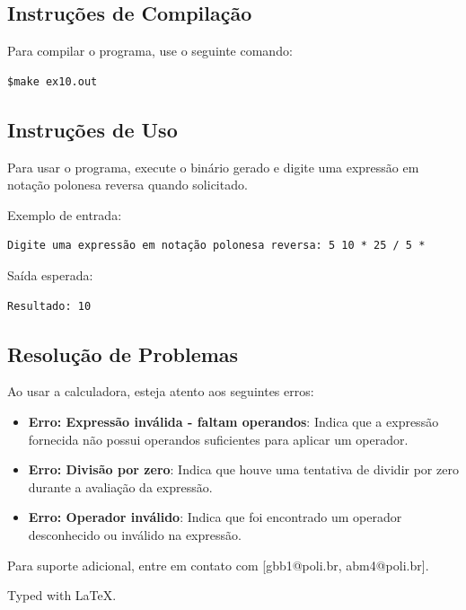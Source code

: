 \documentclass[a4paper,12pt]{article}
\begin{document}
\subsection{Instruções de Compilação}
Para compilar o programa, use o seguinte comando:
\begin{verbatim}
$make ex10.out
\end{verbatim}

\subsection{Instruções de Uso}
Para usar o programa, execute o binário gerado e digite uma expressão em notação polonesa reversa quando solicitado.

Exemplo de entrada:
\begin{verbatim}
Digite uma expressão em notação polonesa reversa: 5 10 * 25 / 5 *
\end{verbatim}
Saída esperada:
\begin{verbatim}
Resultado: 10
\end{verbatim}

\subsection{Resolução de Problemas}
Ao usar a calculadora, esteja atento aos seguintes erros:
\begin{itemize}
    \item \textbf{Erro: Expressão inválida - faltam operandos}: Indica que a expressão fornecida não possui operandos suficientes para aplicar um operador.
    \item \textbf{Erro: Divisão por zero}: Indica que houve uma tentativa de dividir por zero durante a avaliação da expressão.
    \item \textbf{Erro: Operador inválido}: Indica que foi encontrado um operador desconhecido ou inválido na expressão.
\end{itemize}

Para suporte adicional, entre em contato com [gbb1@poli.br, abm4@poli.br].

%



\vfill

Typed with \LaTeX.
\end{document}
